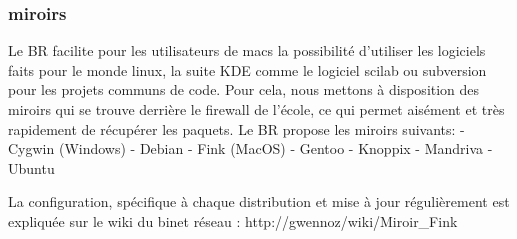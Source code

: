 \subsubsection{miroirs}
Le BR facilite pour les utilisateurs de macs la possibilit\'e d'utiliser les logiciels faits pour le monde linux, la suite KDE comme le logiciel scilab ou subversion pour les projets communs de code. Pour cela, nous mettons \`a disposition des miroirs qui se trouve derri\`ere le firewall de l'\'ecole, ce qui permet ais\'ement et tr\`es rapidement de r\'ecup\'erer les paquets. Le BR propose les miroirs suivants:
	- Cygwin (Windows)
	- Debian
	- Fink (MacOS)
	- Gentoo
	- Knoppix
	- Mandriva
	- Ubuntu
	
La configuration, sp\'ecifique \`a chaque distribution et mise \`a jour r\'eguli\`erement est expliqu\'ee sur le wiki du binet r\'eseau : 
http://gwennoz/wiki/Miroir\_Fink

